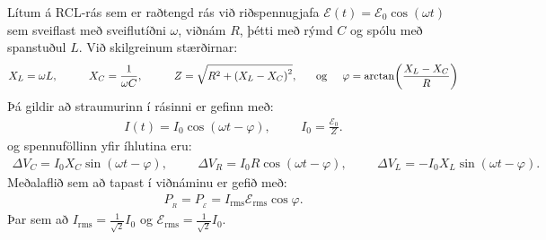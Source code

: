 \begin{tcolorbox}
Lítum á RCL-rás sem er raðtengd rás við riðspennugjafa $\mathcal{E}(t) = \mathcal{E}_0 \cos(\omega t)$ sem sveiflast með sveiflutíðni $\omega$, viðnám $R$, þétti með rýmd $C$ og spólu með spanstuðul $L$. Við skilgreinum stærðirnar:
\begin{align*}
    X_L = \omega L, \hspace{1cm} X_C = \frac{1}{\omega C}, \hspace{1cm} Z = \sqrt{R^2 + \left(X_L - X_C \right)^2}, \hspace{0.6cm} \text{og} \hspace{0.5cm} \varphi = \arctan(\frac{X_L - X_C}{R})
\end{align*}
Þá gildir að straumurinn í rásinni er gefinn með:
\begin{align*}
    I(t) = I_0 \cos(\omega t - \varphi), \hspace{1cm} I_0 = \frac{\mathcal{E}_0}{Z}.
\end{align*}
og spennuföllinn yfir íhlutina eru:
\begin{align*}
    \Delta V_C = I_0 X_C \sin(\omega t - \varphi), \hspace{1cm} \Delta V_R = I_0 R \cos(\omega t - \varphi), \hspace{1cm} \Delta V_L = -I_0 X_L \sin(\omega t - \varphi).
\end{align*}
Meðalaflið sem að tapast í viðnáminu er gefið með:
\begin{align*}
     P_{\!_R} = P_{\!_{\mathcal{E}}} = I_{\text{rms}} \mathcal{E}_{\text{rms}} \cos\varphi.
\end{align*}
Þar sem að $I_{\text{rms}} = \frac{1}{\sqrt{2}}I_0$ og $\mathcal{E}_{\text{rms}} = \frac{1}{\sqrt{2}} I_{0}$.
\end{tcolorbox}

